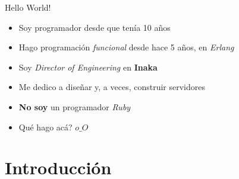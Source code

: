 \documentclass[utf8,hyperref={colorlinks=true}]{beamer}
\begin{document}



\frame{\titlepage}

\begin{frame}{Hello World!}
	\begin{itemize}
		\item<1> Soy programador desde que ten\'ia 10 a\~nos
		\item<2> Hago programaci\'on \emph{funcional} desde hace 5 a\~nos, en \emph{Erlang}
		\item<3> Soy \emph{Director of Engineering} en \textbf{Inaka}
		\item<4> Me dedico a dise\~nar y, a veces, construir servidores
		\item<5> \textbf{No soy} un programador \emph{Ruby}
		\item<6> Qu\'e hago ac\'a? \(o\_O\)
	\end{itemize}
\end{frame}

\section{Introducci\'on}
\end{document}
